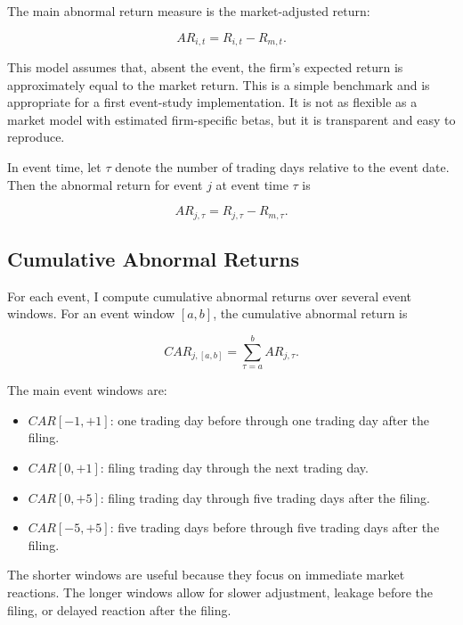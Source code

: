 \documentclass[12pt]{article}
\begin{document}
	The main abnormal return measure is the market-adjusted return:
	
	\begin{equation}
		AR_{i,t} = R_{i,t} - R_{m,t}.
	\end{equation}
	
	This model assumes that, absent the event, the firm's expected return is approximately equal to the market return. This is a simple benchmark and is appropriate for a first event-study implementation. It is not as flexible as a market model with estimated firm-specific betas, but it is transparent and easy to reproduce.
	
	In event time, let $\tau$ denote the number of trading days relative to the event date. Then the abnormal return for event $j$ at event time $\tau$ is
	
	\begin{equation}
		AR_{j,\tau} = R_{j,\tau} - R_{m,\tau}.
	\end{equation}
	
	\subsection{Cumulative Abnormal Returns}
	
	For each event, I compute cumulative abnormal returns over several event windows. For an event window $[a,b]$, the cumulative abnormal return is
	
	\begin{equation}
		CAR_{j,[a,b]} = \sum_{\tau=a}^{b} AR_{j,\tau}.
	\end{equation}
	
	The main event windows are:
	
	\begin{itemize}
		\item $CAR[-1,+1]$: one trading day before through one trading day after the filing.
		\item $CAR[0,+1]$: filing trading day through the next trading day.
		\item $CAR[0,+5]$: filing trading day through five trading days after the filing.
		\item $CAR[-5,+5]$: five trading days before through five trading days after the filing.
	\end{itemize}
	
	The shorter windows are useful because they focus on immediate market reactions. The longer windows allow for slower adjustment, leakage before the filing, or delayed reaction after the filing.
	
\end{document}
